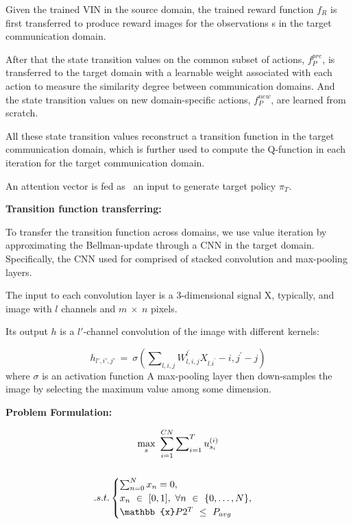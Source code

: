 \documentclass[letterpaper%
, twoside%
, 12pt%
,thesepararticles%
, english%
,creativecommons,hyperref, withAlgo2e%
]{thETS}
\begin{document}
Given the trained VIN in the source domain, the trained reward function $\displaystyle f_{R}$ is first transferred to produce reward images for the observations s in the target communication domain.

After that the state transition values on the common subset of actions, $\displaystyle f_{P}^{pre}$, is transferred to the target domain with a learnable weight associated with each action to measure the similarity degree between communication domains. And the state transition values on new domain-specific actions, $\displaystyle f_{P}^{new}$, are learned from scratch.

All these state transition values reconstruct a transition function in the target communication domain, which is further used to compute the Q-function in each iteration for the target communication domain.

An attention vector is fed as \ an input to generate target policy $\displaystyle \pi _{T}$. 

\textbf{Transition function transferring:}

To transfer the transition function across domains, we use value iteration by approximating the Bellman-update through a CNN in the target domain. Specifically, the CNN used for comprised of stacked convolution and max-pooling layers.


The input to each convolution layer is a 3-dimensional signal X, typically, and image with $\displaystyle l$ channels and $\displaystyle m\ \times \ n$ pixels. 

Its output $\displaystyle h$ is a $\displaystyle l'$-channel convolution of the image with different kernels:

\begin{equation*}
h_{l',i',j'} \ =\ \sigma \left(\sum\nolimits _{l,i,j} W_{l,i,j}^{l^{'}} X_{l.i^{'}} -i,j^{'} -j\right)
\end{equation*}
where $\displaystyle \sigma $ is an activation function A max-pooling layer then down-samples the image by selecting the maximum value among some dimension.

\textbf{Problem Formulation:}

\begin{gather}
\underset{s}{\max} \ \sum _{i=1}^{CN}\sum\nolimits _{i=1}^{T} u_{s_{i}}^{( i)}\\
 \notag\\
.s.t.\begin{cases}
\sum\nolimits _{n=0}^{N} x_{n} =0, & \\
x_{n} \ \in \ [ 0,1] ,\ \forall n\ \in \ \{0,\dotsc ,N\} , & \\
\mathbb{x} P2^{T} \ \leq \ P_{avg} & 
\end{cases} \notag
\end{gather}
\end{document}
